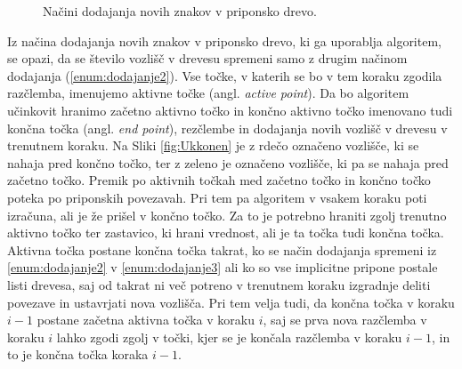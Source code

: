 \begin{figure}[htb]
    \begin{subfigure}[t]{0.3\linewidth}
        
        
        \centering
        \subcaption{}
        \label{fig:aUkkonen1}
    \end{subfigure}
    \hspace{0.5cm}
    \begin{subfigure}[t]{0.3\linewidth}
        
        
        \centering
        \subcaption{}
        \label{fig:aUkkonen2}
    \end{subfigure}
    \hspace{0.5cm}
    \begin{subfigure}[t]{0.3\linewidth}
        
        \subcaption{}
        \centering
        \label{fig:aUkkonen3}
    \end{subfigure}    
           \caption{Načini dodajanja novih znakov v priponsko drevo.} 
            \label{fig:absUkkonen}
    \end{figure}



Iz načina dodajanja novih znakov v priponsko drevo, ki ga uporablja algoritem, se opazi, da se število vozlišč v drevesu spremeni samo z drugim načinom dodajanja (\ref{enum:dodajanje2}). Vse točke, v katerih se bo v tem koraku zgodila razčlemba, imenujemo aktivne točke (angl. \textit{active point}). Da bo algoritem učinkovit hranimo začetno aktivno točko in končno aktivno točko imenovano tudi končna točka (angl. \textit{end point}), rezčlembe in dodajanja novih vozlišč v drevesu v trenutnem koraku. Na Sliki \ref{fig:Ukkonen} je z rdečo označeno vozlišče, ki se nahaja pred končno točko, ter z zeleno je označeno vozlišče, ki pa se nahaja pred začetno točko. Premik po aktivnih točkah med začetno točko in končno točko poteka po priponskih povezavah. Pri tem pa algoritem v vsakem koraku poti izračuna, ali je že prišel v končno točko. Za to je potrebno hraniti zgolj trenutno aktivno točko ter zastavico, ki hrani vrednost, ali je ta točka tudi končna točka. 
Aktivna točka postane končna točka takrat, ko se način dodajanja spremeni iz \ref{enum:dodajanje2} v \ref{enum:dodajanje3} ali ko so vse implicitne pripone postale listi drevesa, saj od takrat ni več potreno v trenutnem koraku izgradnje deliti povezave in ustavrjati nova vozlišča.
Pri tem velja tudi, da končna točka v koraku $i-1$ postane začetna aktivna točka v koraku $i$, saj se prva nova razčlemba v koraku $i$ lahko zgodi zgolj v točki, kjer se je končala razčlemba v koraku $i-1$, in to je končna točka koraka $i-1$. 

